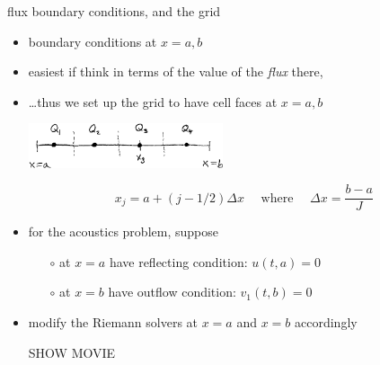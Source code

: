 \documentclass[10pt,hyperref,dvipsnames]{beamer}
\begin{document}
\begin{frame}{flux boundary conditions, and the grid}

\begin{itemize}
\item boundary conditions at $x=a,b$
\item easiest if think in terms of the value of the \emph{flux} there,
\item \dots thus we set up the grid to have cell faces at $x=a,b$

\medskip
\begin{center}
\includegraphics[width=0.45\textwidth]{figs/fluxbdrysketch}
\end{center}

\vspace{-2mm}
    $$x_j = a + (j-1/2) \Delta x \quad \text{ where } \quad \Delta x = \frac{b-a}{J}$$

\item for the acoustics problem, suppose
    \begin{itemize}
    \item[$\circ$] at $x=a$ have reflecting condition: $u(t,a)=0$
    \item[$\circ$] at $x=b$ have outflow condition: $v_1(t,b)=0$
    \end{itemize}
\item modify the Riemann solvers at $x=a$ and $x=b$ accordingly

\vspace{3mm}
\begin{center}
\alert{SHOW MOVIE}
\end{center}
\end{itemize}

\end{frame}
\end{document}
